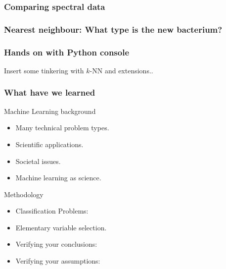 \documentclass{beamer}
\begin{document}
\begin{frame}
\frametitle{Comparing spectral data}
\end{frame}

\begin{frame}
  \frametitle{Nearest neighbour: What type is the new bacterium?}
  
\end{frame}

\begin{frame}
  \frametitle{Hands on with Python console}
  
  {\Large Insert some tinkering with $k$-NN and extensions..}
\end{frame}

\begin{frame}
  \frametitle{What have we learned}
  \begin{block}{Machine Learning background}
    \begin{itemize}
    \item Many \alert{technical} problem types.
    \item \alert{Scientific} applications.
    \item \alert{Societal} issues.
    \item Machine learning as science.
    \end{itemize}
  \end{block}

  \begin{block}{Methodology}
    \begin{itemize}
    \item \alert{Classification} Problems: 
    \item Elementary \alert{variable selection}.
    \item \alert{Verifying} your \alert{conclusions}: 
    \item Verifying your \alert{assumptions}: 
    \end{itemize}
  \end{block}
\end{frame}




\end{document}
